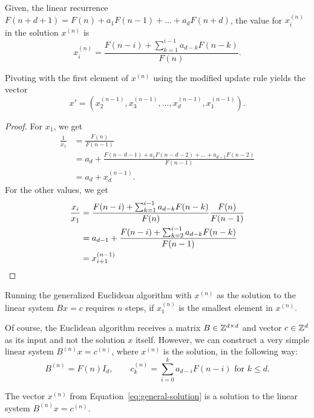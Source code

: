 Given, the linear recurrence $F(n + d + 1) = F(n) + a_1 F(n - 1) + \dots + a_d F(n + d)$,
the value for $x_i^{(n)}$ in the solution $x^{(n)}$ is
\begin{equation}
  \label{eq:general-solution}
  x_i^{(n)} = \frac{F(n - i) + \sum_{k=1}^{i-1} a_{d-k} F(n - k)}{F(n)}.
\end{equation}

\begin{lemma}
  Pivoting with the first element of $x^{(n)}$ using the modified update rule yields the vector
  \[
    x' = (x^{(n-1)}_2, x^{(n-1)}_3, \dots, x^{(n-1)}_d, x^{(n-1)}_1).
  \]
\end{lemma}

\begin{proof}
  For $x_1$, we get
  \[
    \begin{aligned}
      \frac{1}{x_1}
      & = \frac{F(n)}{F(n - 1)} \\
      & = a_d + \frac{F(n - d - 1) + a_1 F(n - d - 2) + \dots + a_{d-1} F(n - 2)}{F(n - 1)} \\
      & = a_d + x^{(n-1)}_d.
    \end{aligned}
  \]
  For the other values, we get
  \begin{align*}
    \frac{x_i}{x_1}
    & = \frac{F(n - i) + \sum_{k=1}^{i-1} a_{d-k} F(n - k)}{F(n)} \frac{F(n)}{F(n - 1)} \\
    & = a_{d-1} + \frac{F(n - i) + \sum_{k=2}^{i-1} a_{d-k} F(n - k)}{F(n-1)} \\
    & = x^{(n-1)}_{i+1} \qedhere
  \end{align*}
\end{proof}

\begin{corollary}
  Running the generalized Euclidean algorithm with $x^{(n)}$ as the solution to
  the linear system $B x = c$ requires $n$ steps, if $x^{(n)}_1$ is the
  smallest element in $x^{(n)}$.
\end{corollary}

Of course, the Euclidean algorithm receives a matrix $B \in {\mathbb Z}^{d \times d}$
and vector $c \in {\mathbb Z}^d$ as its input and not the solution $x$ itself.
However, we can construct a very simple linear system $B^{(n)} x = c^{(n)}$,
where $x^{(n)}$ is the solution, in the following way:
\[
  B^{(n)} = F(n) I_d, \qquad c^{(n)}_k = \sum_{i=0}^k a_{d-i} F(n - i) \text{ for } k ≤ d.
\]

\begin{lemma}
  The vector $x^{(n)}$ from Equation~\ref{eq:general-solution} is a solution to the
  linear system $B^{(n)} x = c^{(n)}$.
\end{lemma}

